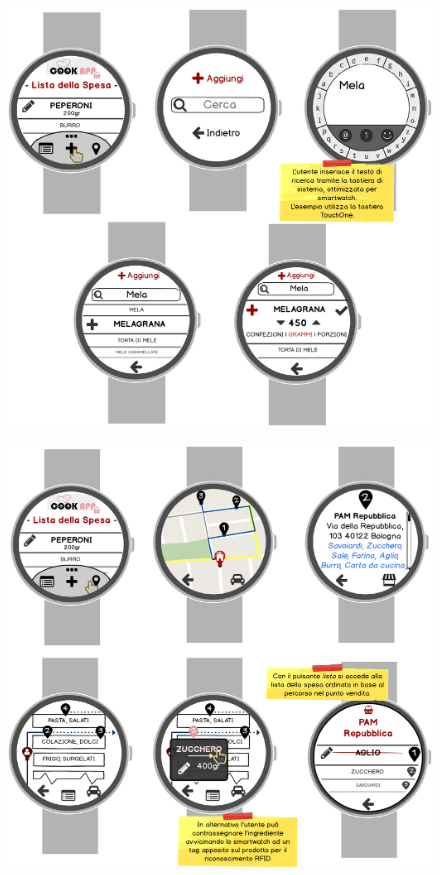 \begin{itemize}
\begin{figure}[H]
\end{figure}
\begin{figure}[H]
	\centering
	\includegraphics[width=0.95\linewidth]{img/mockup/zmart-add.png}
\end{figure}
\begin{figure}[H]
	\centering
	\includegraphics[width=0.95\linewidth]{img/mockup/zmart-punti-vendita.png}

\end{figure}
\end{itemize}
